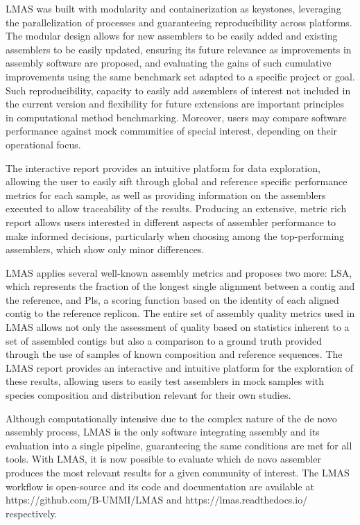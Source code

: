 LMAS was built with modularity and containerization as keystones, leveraging the parallelization of processes and guaranteeing reproducibility across platforms. The modular design allows for new assemblers to be easily added and existing assemblers to be easily updated, ensuring its future relevance as improvements in assembly software are proposed, and evaluating the gains of such cumulative improvements using the same benchmark set adapted to a specific project or goal. Such reproducibility, capacity to easily add assemblers of interest not included in the current version and flexibility for future extensions are important principles in computational method benchmarking. Moreover, users may compare software performance against mock communities of special interest, depending on their operational focus.

The interactive report provides an intuitive platform for data exploration, allowing the user to easily sift through global and reference specific performance metrics for each sample, as well as providing information on the assemblers executed to allow traceability of the results. Producing an extensive, metric rich report allows users interested in different aspects of assembler performance to make informed decisions, particularly when choosing among the top-performing assemblers, which show only minor differences.

LMAS applies several well-known assembly metrics and proposes two more: \ac{LSA}, which represents the fraction of the longest single alignment between a contig and the reference, and \ac{Pls}, a scoring function based on the identity of each aligned contig to the reference replicon. The entire set of assembly quality metrics used in LMAS allows not only the assessment of quality based on statistics inherent to a set of assembled contigs but also a comparison to a ground truth provided through the use of samples of known composition and reference sequences. The LMAS report provides an interactive and intuitive platform for the exploration of these results, allowing users to easily test assemblers in mock samples with species composition and distribution relevant for their own studies.

Although computationally intensive due to the complex nature of the de novo assembly process, LMAS is the only software integrating assembly and its evaluation into a single pipeline, guaranteeing the same conditions are met for all tools. With LMAS, it is now possible to evaluate which de novo assembler produces the most relevant results for a given community of interest. The LMAS workflow is open-source and its code and documentation are available at https://github.com/B-UMMI/LMAS and https://lmas.readthedocs.io/ respectively.


